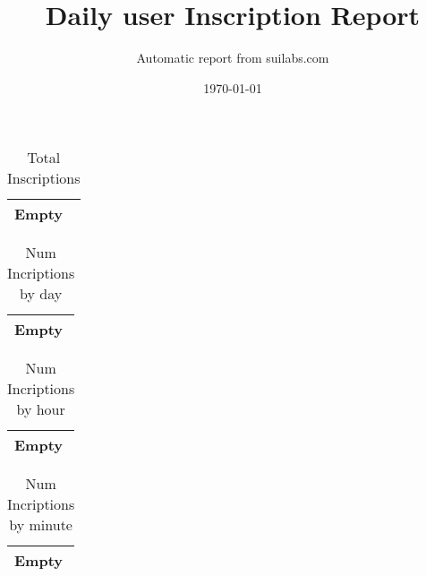 \documentclass{article}
\title{Daily user Inscription Report}
\author{Automatic report from suilabs.com}
\date{\today}
\begin{document}
\maketitle
    \begin{table}[]
\centering
\caption{Total Inscriptions}
\label{lblTotal Inscriptions}
\begin{tabular}{|l|}
\textbf{Empty} \\
\hline 
\end{tabular}
\end{table}

\begin{table}[]
\centering
\caption{Num Incriptions by day}
\label{lblNum Incriptions by day}
\begin{tabular}{|l|}
\textbf{Empty} \\
\hline 
\end{tabular}
\end{table}

\begin{table}[]
\centering
\caption{Num Incriptions by hour}
\label{lblNum Incriptions by hour}
\begin{tabular}{|l|}
\textbf{Empty} \\
\hline 
\end{tabular}
\end{table}

\begin{table}[]
\centering
\caption{Num Incriptions by minute}
\label{lblNum Incriptions by minute}
\begin{tabular}{|l|}
\textbf{Empty} \\
\hline 
\end{tabular}
\end{table}
\end{document}

